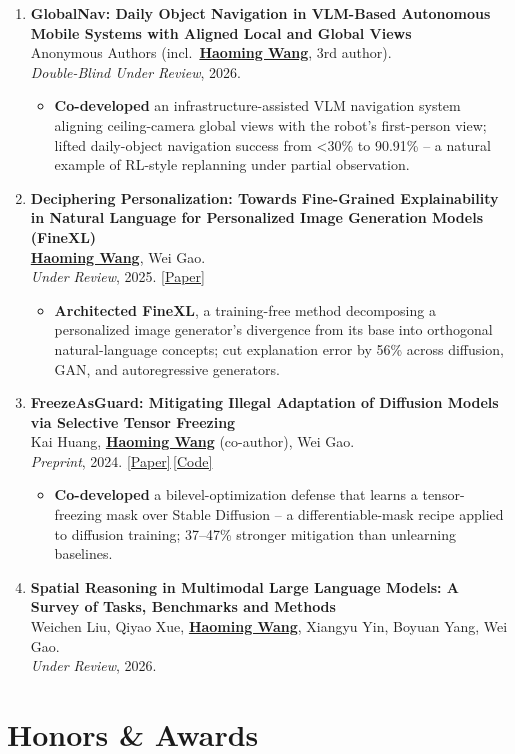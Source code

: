 \documentclass[11pt, letterpaper]{article}
\newenvironment{publist}{
  \begin{enumerate}[leftmargin=1.7em, itemsep=4pt, parsep=0pt, topsep=2pt, label=\arabic*.]
}{\end{enumerate}}
\newcommand{\impactbullet}[1]{%
  \par\vspace{1pt}%
  \begin{itemize}[leftmargin=1.2em, topsep=0pt, itemsep=0pt, parsep=0pt, partopsep=0pt]
    \item #1
  \end{itemize}}
\newcommand{\me}{\underline{\textbf{Haoming Wang}}}
\newcommand{\meco}{\underline{\textbf{Haoming Wang}} (co-author)}
\newcommand{\meanon}{\underline{\textbf{Haoming Wang}}}
\begin{document}
\begin{publist}
\item \textbf{GlobalNav: Daily Object Navigation in VLM-Based Autonomous Mobile Systems with Aligned Local and Global Views}\\
Anonymous Authors (incl.\ \meanon, 3rd author).\\
\textit{Double-Blind Under Review}, 2026.
\impactbullet{\textbf{Co-developed} an infrastructure-assisted VLM navigation system aligning ceiling-camera global views with the robot's first-person view; lifted daily-object navigation success from <30\% to 90.91\% -- a natural example of RL-style replanning under partial observation.}

\item \textbf{Deciphering Personalization: Towards Fine-Grained Explainability in Natural Language for Personalized Image Generation Models (FineXL)}\\
\me, Wei Gao.\\
\textit{Under Review}, 2025. \href{https://haomingwang645.github.io/pdfs/finexl_paper.pdf}{[Paper]}
\impactbullet{\textbf{Architected FineXL}, a training-free method decomposing a personalized image generator's divergence from its base into orthogonal natural-language concepts; cut explanation error by 56\% across diffusion, GAN, and autoregressive generators.}

\item \textbf{FreezeAsGuard: Mitigating Illegal Adaptation of Diffusion Models via Selective Tensor Freezing}\\
Kai Huang, \meco, Wei Gao.\\
\textit{Preprint}, 2024. \href{https://haomingwang645.github.io/pdfs/freezeasguard_paper.pdf}{[Paper]}\,\href{https://github.com/pittisl/FreezeAsGuard}{[Code]}
\impactbullet{\textbf{Co-developed} a bilevel-optimization defense that learns a tensor-freezing mask over Stable Diffusion -- a differentiable-mask recipe applied to diffusion training; 37--47\% stronger mitigation than unlearning baselines.}

\item \textbf{Spatial Reasoning in Multimodal Large Language Models: A Survey of Tasks, Benchmarks and Methods}\\
Weichen Liu, Qiyao Xue, \me, Xiangyu Yin, Boyuan Yang, Wei Gao.\\
\textit{Under Review}, 2026.
\end{publist}

\section{Honors \& Awards}
\end{document}
